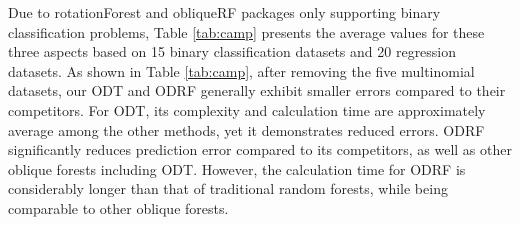 {Due to rotationForest and obliqueRF packages only supporting binary classification problems, Table \ref{tab:camp} presents the average values for these three aspects based on 15 binary classification datasets and 20 regression datasets.}
{	
As shown in Table \ref{tab:camp}, after removing the five multinomial datasets, our ODT and ODRF generally exhibit smaller errors compared to their competitors.} For ODT, its complexity and calculation time are approximately average among the other methods, yet it demonstrates reduced errors. ODRF significantly reduces prediction error compared to its competitors, as well as other oblique forests including ODT. However, the calculation time for ODRF is considerably longer than that of traditional random forests, while being comparable to other oblique forests.

